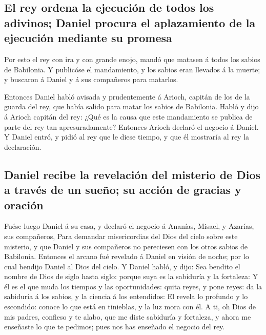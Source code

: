 \hypertarget{el-rey-ordena-la-ejecuciuxf3n-de-todos-los-adivinos-daniel-procura-el-aplazamiento-de-la-ejecuciuxf3n-mediante-su-promesa}{%
\subsection{El rey ordena la ejecución de todos los adivinos; Daniel
procura el aplazamiento de la ejecución mediante su
promesa}\label{el-rey-ordena-la-ejecuciuxf3n-de-todos-los-adivinos-daniel-procura-el-aplazamiento-de-la-ejecuciuxf3n-mediante-su-promesa}}

 Por esto el rey con ira y con grande enojo, mandó que
matasen á todos los sabios de Babilonia.  Y publicóse el
mandamiento, y los sabios eran llevados á la muerte; y buscaron á Daniel
y á sus compañeros para matarlos.

 Entonces Daniel habló avisada y prudentemente á Arioch,
capitán de los de la guarda del rey, que había salido para matar los
sabios de Babilonia.  Habló y dijo á Arioch capitán del
rey: ¿Qué es la causa que este mandamiento se publica de parte del rey
tan apresuradamente? Entonces Arioch declaró el negocio á Daniel.
 Y Daniel entró, y pidió al rey que le diese tiempo, y
que él mostraría al rey la declaración.

\hypertarget{daniel-recibe-la-revelaciuxf3n-del-misterio-de-dios-a-travuxe9s-de-un-sueuxf1o-su-acciuxf3n-de-gracias-y-oraciuxf3n}{%
\subsection{Daniel recibe la revelación del misterio de Dios a través de
un sueño; su acción de gracias y
oración}\label{daniel-recibe-la-revelaciuxf3n-del-misterio-de-dios-a-travuxe9s-de-un-sueuxf1o-su-acciuxf3n-de-gracias-y-oraciuxf3n}}

 Fuése luego Daniel á su casa, y declaró el negocio á
Ananías, Misael, y Azarías, sus compañeros,  Para
demandar misericordias del Dios del cielo sobre este misterio, y que
Daniel y sus compañeros no pereciesen con los otros sabios de Babilonia.
 Entonces el arcano fué revelado á Daniel en visión de
noche; por lo cual bendijo Daniel al Dios del cielo.  Y
Daniel habló, y dijo: Sea bendito el nombre de Dios de siglo hasta
siglo: porque suya es la sabiduría y la fortaleza:  Y él
es el que muda los tiempos y las oportunidades: quita reyes, y pone
reyes: da la sabiduría á los sabios, y la ciencia á los entendidos:
 El revela lo profundo y lo escondido: conoce lo que está
en tinieblas, y la luz mora con él.  A ti, oh Dios de mis
padres, confieso y te alabo, que me diste sabiduría y fortaleza, y ahora
me enseñaste lo que te pedimos; pues nos has enseñado el negocio del
rey.

